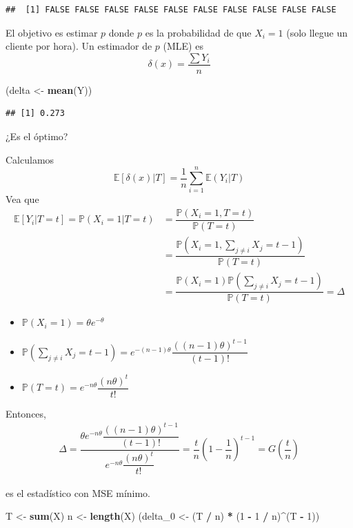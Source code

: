 \documentclass[
  12pt,
]{book}
\newenvironment{Shaded}{\begin{snugshade}}{\end{snugshade}}
\newcommand{\DecValTok}[1]{\textcolor[rgb]{0.00,0.00,0.81}{#1}}
\newcommand{\KeywordTok}[1]{\textcolor[rgb]{0.13,0.29,0.53}{\textbf{#1}}}
\newcommand{\NormalTok}[1]{#1}
\newcommand{\OperatorTok}[1]{\textcolor[rgb]{0.81,0.36,0.00}{\textbf{#1}}}
\newcommand{\StringTok}[1]{\textcolor[rgb]{0.31,0.60,0.02}{#1}}
\begin{document}
\begin{verbatim}
##  [1] FALSE FALSE FALSE FALSE FALSE FALSE FALSE FALSE FALSE FALSE
\end{verbatim}

El objetivo es estimar \(p\) donde \(p\) es la probabilidad de que \(X_i =1\) (solo llegue un cliente por hora). Un estimador de \(p\) (MLE) es
\[\delta(x) = \dfrac{\sum Y_i}{n}\]

\begin{Shaded}
\begin{Highlighting}[]
\NormalTok{(delta \textless{}{-}}\StringTok{ }\KeywordTok{mean}\NormalTok{(Y))}
\end{Highlighting}
\end{Shaded}

\begin{verbatim}
## [1] 0.273
\end{verbatim}

¿Es el óptimo?

Calculamos
\[\mathbb E[\delta(x)|T] = \dfrac 1n \sum_{i=1}^n \mathbb E (Y_i|T)\]
Vea que
\begin{align*}
\mathbb E[Y_i|T = t] = \mathbb P(X_i = 1 | T = t) & = \dfrac{\mathbb P(X_i = 1, T=t)}{\mathbb P(T=t)}\\
& = \dfrac{\mathbb P(X_i = 1, \sum_{j\ne i} X_j = t-1)}{\mathbb P(T=t)}\\
& = \dfrac{\mathbb P(X_i = 1) \mathbb P(\sum_{j\ne i} X_j = t-1)}{\mathbb P(T=t)} = \Delta
\end{align*}

\begin{itemize}
\item
  \(\mathbb P(X_i = 1) = \theta e^{-\theta}\)
\item
  \(\mathbb P(\sum_{j\ne i}X_j = t-1) = e^{-(n-1)\theta}\dfrac{((n-1)\theta)^{t-1}}{(t-1)!}\)
\item
  \(\mathbb P(T=t) = e^{-n\theta}\dfrac{(n\theta)^t}{t!}\)
\end{itemize}

Entonces,
\begin{align*}
\Delta = \dfrac{\theta e^{-n\theta}\dfrac{((n-1)\theta)^{t-1}}{(t-1)!}}{e^{-n\theta}\dfrac{(n\theta)^t}{t!}} = \dfrac tn \left(1-\dfrac 1n\right)^{t-1} = G\left(\dfrac tn\right)
\end{align*}

es el estadístico con MSE mínimo.

\begin{Shaded}
\begin{Highlighting}[]
\NormalTok{T \textless{}{-}}\StringTok{ }\KeywordTok{sum}\NormalTok{(X)}
\NormalTok{n \textless{}{-}}\StringTok{ }\KeywordTok{length}\NormalTok{(X)}
\NormalTok{(delta\_}\DecValTok{0}\NormalTok{ \textless{}{-}}\StringTok{ }\NormalTok{(T }\OperatorTok{/}\StringTok{ }\NormalTok{n) }\OperatorTok{*}\StringTok{ }\NormalTok{(}\DecValTok{1} \OperatorTok{{-}}\StringTok{ }\DecValTok{1} \OperatorTok{/}\StringTok{ }\NormalTok{n)}\OperatorTok{\^{}}\NormalTok{(T }\OperatorTok{{-}}\StringTok{ }\DecValTok{1}\NormalTok{))}
\end{Highlighting}
\end{Shaded}
\end{document}
